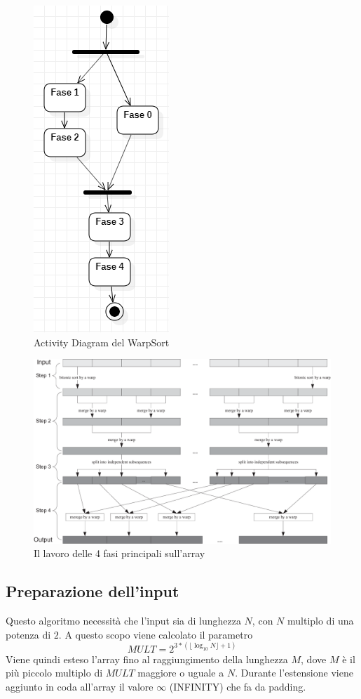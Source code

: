 \documentclass[a4paper, 11pt]{article}
\begin{document}
		\begin{figure}
			\centering
			\includegraphics[width=0.3\linewidth]{img/ActivityDiagram}
			\caption{Activity Diagram del WarpSort}
			\label{fig:activitydiagram}
		\end{figure}		
		\begin{figure}
			\centering
			\includegraphics[width=0.9\linewidth]{img/fasiPrincipali}
			\caption{Il lavoro delle 4 fasi principali sull'array}
			\label{fig:fasiprincipali}
		\end{figure}
		
		\subsection{Preparazione dell'input}
			\label{preInput}
			Questo algoritmo necessità che l'input sia di lunghezza  $N$, con $N$ multiplo di una potenza di $2$.
			A questo scopo viene calcolato il parametro 
			$$MULT = 2^{3 * (\lfloor \log_{10} N\rfloor + 1)}$$ 
			Viene quindi esteso l'array fino al raggiungimento della lunghezza $M$, dove $M$ è il più piccolo multiplo di $MULT$ maggiore
			o uguale a $N$.
			Durante l'estensione viene aggiunto in coda all'array il valore $\infty$ (INFINITY) che fa da padding.
		
\end{document}
